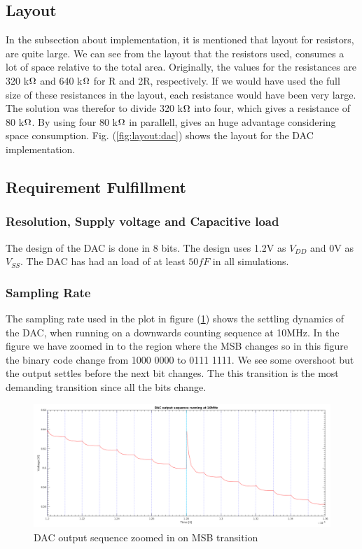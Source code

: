 \documentclass[english, 12pt, a4paper]{ifimaster}
\begin{document}
\subsection{Layout}
In the subsection about implementation, it is mentioned that layout for resistors, are quite 
large. We can see from the layout that the resistors used, consumes a lot of space relative to the total area. Originally, the values for the resistances are
320 k\(\ohm\) and 640 k\(\ohm\) for R and 2R, respectively. If we would have used the full size of these resistances in the layout, each resistance would have been
very large. The solution was therefor to divide 320 k\(\ohm\) into four, which gives a resistance of 80 k\(\ohm\). By using four 80 k\(\ohm\) in parallell, gives an huge
advantage considering space consumption. Fig. (\ref{fig:layout:dac}) shows the layout for the DAC implementation.

\subsection{Requirement Fulfillment}

\subsubsection{Resolution, Supply voltage and Capacitive load}
The design of the DAC is done in 8 bits. The design uses 1.2V as \(V_{DD}\) and 0V as \(V_{SS}\).
The DAC has had an load of at least \(50fF\) in all simulations.

\subsubsection{Sampling Rate}
The sampling rate used in the plot in figure (\ref{figure:dac:closeup}) shows the settling dynamics of the DAC, when running on a downwards counting sequence at 10MHz.
In the figure we have zoomed in to the region where the MSB changes so in this figure the binary code change from 1000 0000 to 0111 1111. 
We see some overshoot but the output settles before the next bit changes. 
The this transition is the most demanding transition since all the bits change.
\begin{figure}[!ht]
 \centering     
 \includegraphics[width=\textwidth]{img/dac/dac_running_at_10MHz_closeup_at_center}
 \caption{DAC output sequence zoomed in on MSB transition}
 \label{figure:dac:closeup}
\end{figure}
\end{document}

